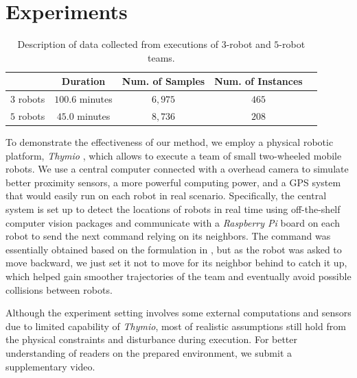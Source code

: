 \documentclass[letterpaper, 10 pt, conference]{ieeeconf}  %
\begin{document}
	\section{Experiments} 
	\label{sec:experiments} 
	
	\setlength{\tabcolsep}{0.5em} %
	{\renewcommand{\arraystretch}{1.2}%
		\begin{table}[t]
			\label{table:data_description}
			\centering
			\begin{tabular}{|c|c|c|c|c|}
				\hline
							&  Duration & Num. of Samples & Num. of Instances  \\ \hline
				$3$ robots & $100.6$ minutes & $6,975$ & $465$  \\ \hline
				$5$ robots & $45.0$ minutes  & $8,736$ & $208$  \\ \hline
			\end{tabular}
			\caption{Description of data collected from executions of $3$-robot and $5$-robot teams.}
		\end{table}
	}	
	
	To demonstrate the effectiveness of our method, we employ a physical robotic platform, 
	\emph{Thymio} \cite{Shin14}, which allows to execute a team of small two-wheeled 
	mobile robots. We use a central computer connected with a overhead camera to simulate
	better proximity 
	sensors, a more powerful computing power, and a GPS system that would easily run on each robot in 
	real scenario. 
	Specifically, the central system is set up to detect the locations of robots in real
	time using off-the-shelf computer vision packages 
	and communicate with a \emph{Raspberry Pi} board \cite{Upton14} on each robot to send
	the next command relying on its neighbors. 
	The command was essentially obtained based on the formulation in \cite{CPR17}, but 
    as the robot was asked to move backward, we just set it not to move for its 
	neighbor behind to catch it up, which helped gain smoother trajectories of the team
	and eventually avoid possible collisions between robots. 
	
	Although the experiment setting involves 
	some external computations and sensors due to limited capability of \emph{Thymio}, 
	most of realistic assumptions still hold from the physical constraints and disturbance
	during execution. For better understanding of readers on the prepared environment, 
	we submit a supplementary video. 
	
\end{document}
